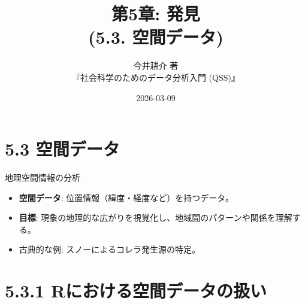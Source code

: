 \documentclass[
  ignorenonframetext,
]{beamer}
\title{第5章: 発見\\
(5.3. 空間データ)}
\subtitle{今井耕介 著\\
『社会科学のためのデータ分析入門 (QSS)』}
\author{}
\date{\vspace{-2.5em}2026-03-09}
\providecommand{\tightlist}{%
  \setlength{\itemsep}{0pt}\setlength{\parskip}{0pt}}
\begin{document}
\frame{\titlepage}

\hypertarget{ux7a7aux9593ux30c7ux30fcux30bf}{%
\section{5.3 空間データ}\label{ux7a7aux9593ux30c7ux30fcux30bf}}

\begin{frame}{地理空間情報の分析}
\protect\hypertarget{ux5730ux7406ux7a7aux9593ux60c5ux5831ux306eux5206ux6790}{}
\begin{itemize}
\tightlist
\item
  \textbf{空間データ}: 位置情報（緯度・経度など）を持つデータ。
\item
  \textbf{目標}:
  現象の地理的な広がりを視覚化し、地域間のパターンや関係を理解する。
\item
  古典的な例: スノーによるコレラ発生源の特定。
\end{itemize}
\end{frame}

\hypertarget{rux306bux304aux3051ux308bux7a7aux9593ux30c7ux30fcux30bfux306eux6271ux3044}{%
\section{5.3.1
Rにおける空間データの扱い}\label{rux306bux304aux3051ux308bux7a7aux9593ux30c7ux30fcux30bfux306eux6271ux3044}}
\end{document}
